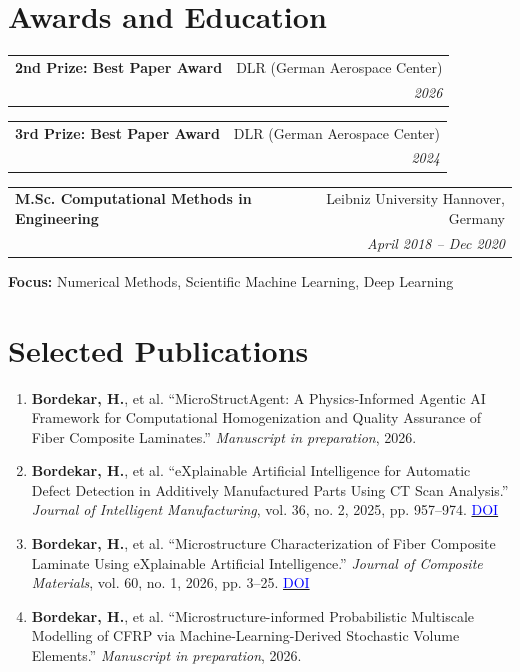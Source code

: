 \documentclass[a4paper,20pt]{article}
\makeatletter
\newcommand{\resumeSubheading}[4]{
  \vspace{-1pt}\item
    \begin{tabular*}{0.97\textwidth}{l@{\extracolsep{\fill}}r}
      \textbf{#1} & #2 \\
      \textit{#3} & \textit{#4} \\
    \end{tabular*}\vspace{-5pt}
}
\makeatother
\begin{document}
\vspace{0.2cm}
\vspace{5pt}

\section{\color{blue}Awards and Education}

\resumeSubheading
  {\textcolor{green!50!black}{\faAward} \textbf{2nd Prize: Best Paper Award}}
  {DLR (German Aerospace Center)}{}{2026}
\resumeSubheading
  {\textcolor{green!50!black}{\faAward} \textbf{3rd Prize: Best Paper Award}}
  {DLR (German Aerospace Center)}{}{2024}
\vspace{4pt}

\resumeSubheading
  {\textcolor{green!50!black}{M.Sc.} Computational Methods in Engineering}
  {Leibniz University Hannover, Germany}{}{April 2018 -- Dec 2020}
  \vspace{2pt}
\textbf{Focus:} Numerical Methods, Scientific Machine Learning, Deep Learning
\vspace{4pt}

\section{\color{blue}Selected Publications}

\begin{enumerate}

  \item \textbf{Bordekar, H.}, et al.
  ``MicroStructAgent: A Physics-Informed Agentic AI Framework for Computational Homogenization and Quality Assurance of Fiber Composite Laminates.''
  \textit{Manuscript in preparation}, 2026.

  \item \textbf{Bordekar, H.}, et al.
  ``eXplainable Artificial Intelligence for Automatic Defect Detection in Additively Manufactured Parts Using CT Scan Analysis.''
  \textit{Journal of Intelligent Manufacturing}, vol. 36, no. 2, 2025, pp. 957--974.
  \href{https://link.springer.com/article/10.1007/s10845-023-02272-4}{\textcolor{blue}{DOI}}

  \item \textbf{Bordekar, H.}, et al.
  ``Microstructure Characterization of Fiber Composite Laminate Using eXplainable Artificial Intelligence.''
  \textit{Journal of Composite Materials}, vol. 60, no. 1, 2026, pp. 3--25.
  \href{https://journals.sagepub.com/doi/pdf/10.1177/00219983251345559}{\textcolor{blue}{DOI}}

  \item \textbf{Bordekar, H.}, et al.
  ``Microstructure-informed Probabilistic Multiscale Modelling of CFRP via Machine-Learning-Derived Stochastic Volume Elements.''
  \textit{Manuscript in preparation}, 2026.

\end{enumerate}
\vspace{2pt}
\end{document}
